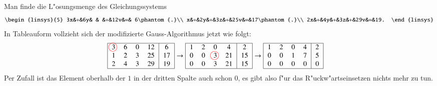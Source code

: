 \begin{beispiel}
Man finde die L"osungsmenge des Gleichungssystems
\[
\begin{linsys}{5}
3x&+&6y& &  &+&12v&=& 6\phantom{.}\\
 x&+&2y&+&3z&+&25v&=&17\phantom{.}\\
2x&+&4y&+&3z&+&29v&=&19.
\end{linsys}
\]
In Tableauform vollzieht sich der modifizierte Gauss-Algorithmus jetzt wie
folgt:
\begin{align*}
\begin{tabular}{| >{$}c<{$} >{$}c<{$} >{$}c<{$} >{$}c<{$} | >{$}c<{$} |}
\hline
  3
\begin{picture}(0,0)
\color{red}\put(-3.5,3){\circle{12}}
\end{picture}
   &  6&  0& 12&  6\\
  1&  2&  3& 25& 17\\
  2&  4&  3& 29& 19\\
\hline
\end{tabular}
&\rightarrow
\begin{tabular}{| >{$}c<{$} >{$}c<{$} >{$}c<{$} >{$}c<{$} | >{$}c<{$} |}
\hline
  1&  2&  0&  4&  2\\
  0&  0&  3
\begin{picture}(0,0)
\color{red}\put(-3.5,3){\circle{12}}
\end{picture}
           & 21& 15\\
  0&  0&  3& 21& 15\\
\hline
\end{tabular}
\rightarrow
\begin{tabular}{| >{$}c<{$} >{$}c<{$} >{$}c<{$} >{$}c<{$} | >{$}c<{$} |}
\hline
  1&  2&  0&  4&  2\\
  0&  0&  1&  7&  5\\
  0&  0&  0&  0&  0\\
\hline
\end{tabular}
\end{align*}
Per Zufall ist das Element oberhalb der $1$ in der dritten Spalte auch schon $0$,
es gibt also f"ur das R"uckw"artseinsetzen nichts mehr zu tun.


\end{beispiel}
